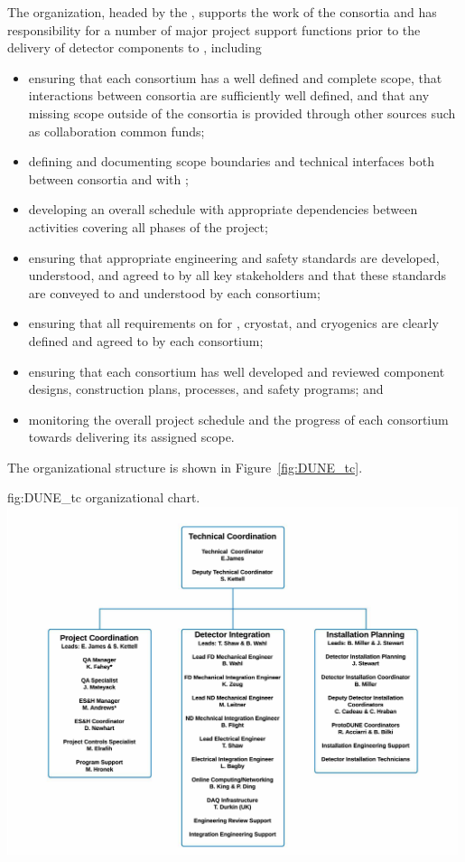 The  organization, headed by the , supports the work of 
the consortia and has responsibility for a number of major project 
support functions prior to the delivery of detector components to 
, including
\begin{itemize}
\item ensuring that each consortium has a well defined and complete
  scope, that interactions between consortia are sufficiently 
  well defined, and that any missing scope outside of the 
  consortia is provided through other sources such as collaboration
  common funds;
\item defining and documenting scope boundaries and technical 
  interfaces both between consortia and with ;  
\item developing an overall schedule with appropriate dependencies
  between activities covering all phases of the project; 
\item ensuring that appropriate engineering and safety standards 
  are developed, understood, and agreed to by all key stakeholders 
  and that these standards are conveyed to and understood by each
  consortium;
\item ensuring that all  requirements on  
  for , cryostat, and cryogenics are clearly defined and 
  agreed to by each consortium;
\item ensuring that each consortium has well developed and reviewed
  component designs, construction plans,  processes, and 
  safety programs; and
\item monitoring the overall project schedule and the progress of 
  each consortium towards delivering its assigned scope. 
\end{itemize}
The   organizational structure is shown 
in Figure~\ref{fig:DUNE_tc}. 
\begin{dunefigure}{fig:DUNE_tc}
  {  organizational chart.}
  \includegraphics[width=0.99\textwidth]{graphics/TC_OrgChart_v2}
\end{dunefigure}

